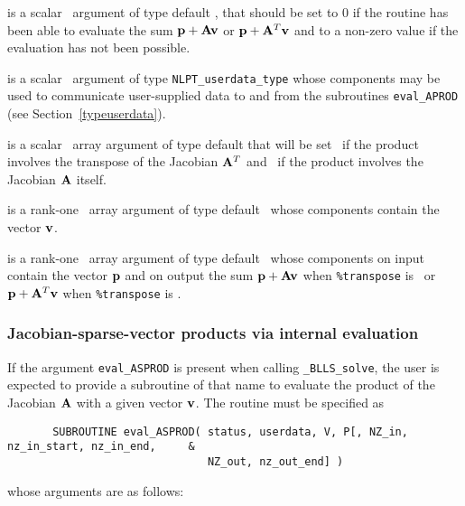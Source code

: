 \documentclass{galahad}
\newcommand{\packagename}{BLLS}
\newcommand{\fullpackagename}{\libraryname\_\packagename}
\newcommand{\solver}{{\tt \fullpackagename\_solve}}
\begin{document}
\begin{description}
 is a scalar \intentout\ argument of type default \integer,
that should be set to 0 if the routine has been able to evaluate the
sum ${\mathbf{p}} + {\mathbf{A}} {\mathbf{v}}$ or ${\mathbf{p}} + {\mathbf{A}}^T{\mathbf{v}}$
and to a non-zero value if the evaluation has not been possible.

 is a scalar \intentinout\ argument of type
{\tt NLPT\_userdata\_type} whose components may be used
to communicate user-supplied data to and from the subroutines
{\tt eval\_APROD}
(see Section~\ref{typeuserdata}).

 is a scalar \intentin\ array argument of type
default that will be set \true\ if the product involves the transpose
of the Jacobian ${\mathbf{A}}^T$ and \false\ if the product involves
the Jacobian ${\mathbf{A}}$ itself.

 is a rank-one \intentin\ array argument of type default \realdp\
whose components contain the vector ${\mathbf{v}}$.

 is a rank-one \intentinout\ array argument of type default \realdp\
whose components on input contain the vector ${\mathbf{p}}$ and on output the
sum ${\mathbf{p}} + {\mathbf{A}} {\mathbf{v}}$ when {\tt \%transpose} is \false\ or
${\mathbf{p}} + {\mathbf{A}}^T {\mathbf{v}}$ when {\tt \%transpose} is \true.

\end{description}



\subsubsection{Jacobian-sparse-vector products via internal evaluation\label{jvps}}

If the argument {\tt eval\_ASPROD} is present when calling \solver, the
user is expected to provide a subroutine of that name to evaluate the
product of the Jacobian ${\mathbf{A}}$ with a given vector ${\mathbf{v}}$.
The routine must be specified as

\def\baselinestretch{0.8}
{\tt \begin{verbatim}
       SUBROUTINE eval_ASPROD( status, userdata, V, P[, NZ_in, nz_in_start, nz_in_end,     &
                               NZ_out, nz_out_end] )
\end{verbatim} }
\def\baselinestretch{1.0}
\noindent whose arguments are as follows:
\end{document}
